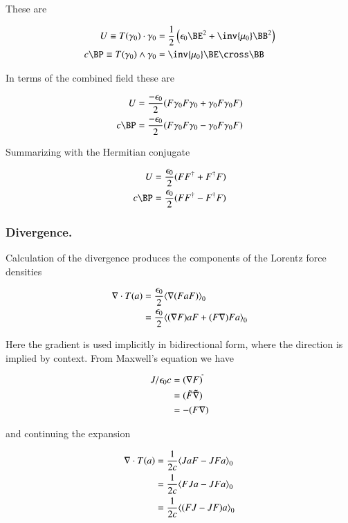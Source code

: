 These are

\begin{align}
U \equiv T(\gamma_0) \cdot \gamma_0 &= \frac{1}{2} \left( \epsilon_0 \BE^2 + \inv{\mu_0} \BB^2 \right) \\
c \BP \equiv T(\gamma_0) \wedge \gamma_0 &= \inv{\mu_0} \BE \cross \BB
\end{align}

In terms of the combined field these are

\begin{align}
U &= \frac{-\epsilon_0}{2}( F \gamma_0 F \gamma_0 + \gamma_0 F \gamma_0 F) \\
c \BP &= \frac{-\epsilon_0}{2}( F \gamma_0 F \gamma_0 - \gamma_0 F \gamma_0 F)
\end{align}

Summarizing with the Hermitian conjugate

\begin{align}
U &= \frac{\epsilon_0}{2}( F F^\dagger + F^\dagger F) \\
c \BP &= \frac{\epsilon_0}{2}( F F^\dagger - F^\dagger F)
\end{align}

\subsubsection{ Divergence. }

Calculation of the divergence produces the components of the Lorentz force densities

\begin{align*}
\nabla \cdot T(a)
&= \frac{\epsilon_0}{2} {\left\langle{{ \nabla(F a F) }}\right\rangle}_{0} \\
&= \frac{\epsilon_0}{2} {\left\langle{{ (\nabla F) a F + (F \nabla) F a }}\right\rangle}_{0} \\
\end{align*}

Here the gradient is used implicitly in bidirectional form, where the direction is implied by context.  From Maxwell's equation we have

\begin{align*}
J/\epsilon_0 c
&= (\nabla F)^{\tilde{}} \\
&= (\tilde{F} \tilde{\nabla}) \\
&= -(F \nabla)
\end{align*}

and continuing the expansion

\begin{align*}
\nabla \cdot T(a)
&= \frac{1}{2c} {\left\langle{{ J a F - J F a }}\right\rangle}_{0} \\
&= \frac{1}{2c} {\left\langle{{ F J a - J F a }}\right\rangle}_{0} \\
&= \frac{1}{2c} {\left\langle{{ (F J - J F) a }}\right\rangle}_{0} \\
\end{align*}

